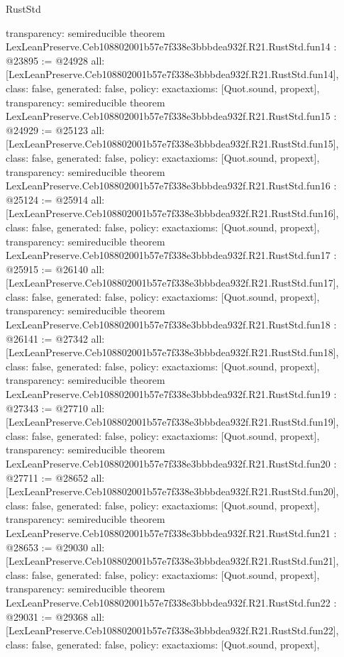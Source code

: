 \begin{lexlean}{RustStd}
\begin{coremodule}
{  transparency: semireducible
}
theorem LexLeanPreserve.Ceb108802001b57e7f338e3bbbdea932f.R21.RustStd.fun14 : @23895 := @24928 {
  all: [LexLeanPreserve.Ceb108802001b57e7f338e3bbbdea932f.R21.RustStd.fun14],
  class: false,
  generated: false,
  policy: exact{axioms: [Quot.sound, propext]},
  transparency: semireducible
}
theorem LexLeanPreserve.Ceb108802001b57e7f338e3bbbdea932f.R21.RustStd.fun15 : @24929 := @25123 {
  all: [LexLeanPreserve.Ceb108802001b57e7f338e3bbbdea932f.R21.RustStd.fun15],
  class: false,
  generated: false,
  policy: exact{axioms: [Quot.sound, propext]},
  transparency: semireducible
}
theorem LexLeanPreserve.Ceb108802001b57e7f338e3bbbdea932f.R21.RustStd.fun16 : @25124 := @25914 {
  all: [LexLeanPreserve.Ceb108802001b57e7f338e3bbbdea932f.R21.RustStd.fun16],
  class: false,
  generated: false,
  policy: exact{axioms: [Quot.sound, propext]},
  transparency: semireducible
}
theorem LexLeanPreserve.Ceb108802001b57e7f338e3bbbdea932f.R21.RustStd.fun17 : @25915 := @26140 {
  all: [LexLeanPreserve.Ceb108802001b57e7f338e3bbbdea932f.R21.RustStd.fun17],
  class: false,
  generated: false,
  policy: exact{axioms: [Quot.sound, propext]},
  transparency: semireducible
}
theorem LexLeanPreserve.Ceb108802001b57e7f338e3bbbdea932f.R21.RustStd.fun18 : @26141 := @27342 {
  all: [LexLeanPreserve.Ceb108802001b57e7f338e3bbbdea932f.R21.RustStd.fun18],
  class: false,
  generated: false,
  policy: exact{axioms: [Quot.sound, propext]},
  transparency: semireducible
}
theorem LexLeanPreserve.Ceb108802001b57e7f338e3bbbdea932f.R21.RustStd.fun19 : @27343 := @27710 {
  all: [LexLeanPreserve.Ceb108802001b57e7f338e3bbbdea932f.R21.RustStd.fun19],
  class: false,
  generated: false,
  policy: exact{axioms: [Quot.sound, propext]},
  transparency: semireducible
}
theorem LexLeanPreserve.Ceb108802001b57e7f338e3bbbdea932f.R21.RustStd.fun20 : @27711 := @28652 {
  all: [LexLeanPreserve.Ceb108802001b57e7f338e3bbbdea932f.R21.RustStd.fun20],
  class: false,
  generated: false,
  policy: exact{axioms: [Quot.sound, propext]},
  transparency: semireducible
}
theorem LexLeanPreserve.Ceb108802001b57e7f338e3bbbdea932f.R21.RustStd.fun21 : @28653 := @29030 {
  all: [LexLeanPreserve.Ceb108802001b57e7f338e3bbbdea932f.R21.RustStd.fun21],
  class: false,
  generated: false,
  policy: exact{axioms: [Quot.sound, propext]},
  transparency: semireducible
}
theorem LexLeanPreserve.Ceb108802001b57e7f338e3bbbdea932f.R21.RustStd.fun22 : @29031 := @29368 {
  all: [LexLeanPreserve.Ceb108802001b57e7f338e3bbbdea932f.R21.RustStd.fun22],
  class: false,
  generated: false,
  policy: exact{axioms: [Quot.sound, propext]},
}
\end{coremodule}
\end{lexlean}
